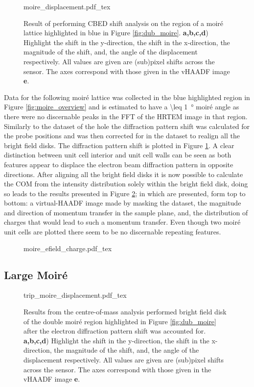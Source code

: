 \begin{figure}
    \centering
    \def\svgwidth{.95\linewidth}
    {moire_displacement.pdf_tex}
    \caption{Result of performing CBED shift analysis on the region of a moiré lattice highlighted in blue in Figure \ref{fig:dub_moire}. \textbf{a,b,c,d}) Highlight the shift in the y-direction, the shift in the x-direction, the magnitude of the shift, and, the angle of the displacement respectively. All values are given are (sub)pixel shifts across the sensor. The axes correspond with those given in the vHAADF image \textbf{e}.}
    \label{fig:m_dis}
\end{figure}

Data for the following moiré lattice was collected in the blue highlighted region in Figure \ref{fig:moire_overview} and is estimated to have a \SI{\leq 1}{\degree} moiré angle as there were no discernable peaks in the FFT of the HRTEM image in that region. Similarly to the dataset of the hole the diffraction pattern shift was calculated for the probe positions and was then corrected for in the dataset to realign all the bright field disks. The diffraction pattern shift is plotted in Figure \ref{fig:m_dis}. A clear distinction between unit cell interior and unit cell walls can be seen as both features appear to displace the electron beam diffraction pattern in opposite directions. After aligning all the bright field disks it is now possible to calculate the COM from the intensity distribution solely within the bright field disk, doing so leads to the results presented in Figure \ref{fig:m_mom}; in which are presented, form top to bottom: a virtual-HAADF image made by masking the dataset, the magnitude and direction of momentum transfer in the sample plane, and, the distribution of charges that would lead to such a momentum transfer. Even though two moiré unit cells are plotted there seem to be no discernable repeating features.

\begin{figure}
    \centering
    \def\svgwidth{.5\linewidth}
    {moire_efield_charge.pdf_tex}
    \caption{}
    \label{fig:m_mom}
\end{figure}

\subsection{Large Moiré}

\begin{figure}
    \centering
    \def\svgwidth{.95\linewidth}
    {trip_moire_displacement.pdf_tex}
    \caption{Results from the centre-of-mass analysis performed bright field disk of the double moiré region highlighted in Figure \ref{fig:dub_moire} after the electron diffraction pattern shift was accounted for. \textbf{a,b,c,d}) Highlight the shift in the y-direction, the shift in the x-direction, the magnitude of the shift, and, the angle of the displacement respectively. All values are given are (sub)pixel shifts across the sensor. The axes correspond with those given in the vHAADF image \textbf{e}.}
    \label{fig:trip_m_dis}
\end{figure}

